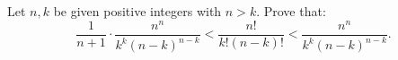 Let $n,k$ be given positive integers with $n>k$. Prove that:
\[ \frac{1}{n+1} \cdot \frac{n^n}{k^k (n-k)^{n-k}} < \frac{n!}{k! (n-k)!} < \frac{n^n}{k^k(n-k)^{n-k}}. \]